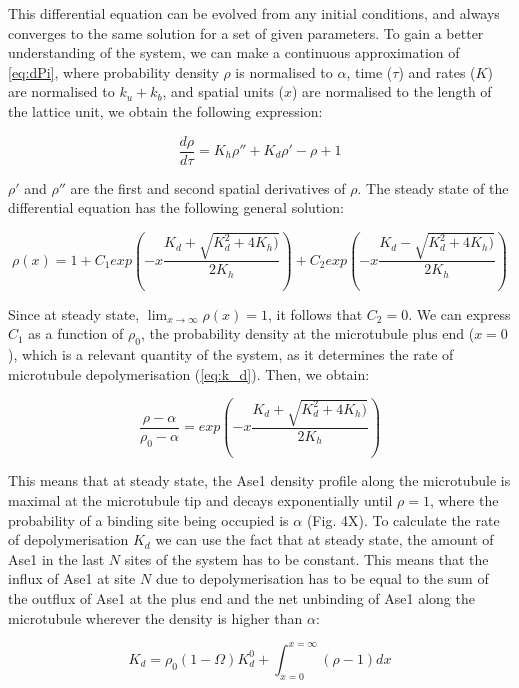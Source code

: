 \documentclass{article}
\begin{document}
This differential equation can be evolved from any initial conditions, and always converges to the same solution for a set of given parameters. To gain a better understanding of the system, we can make a continuous approximation of \autoref{eq:dPi}, where probability density $\rho$ is normalised to $\alpha$, time ($\tau$) and rates ($K$) are normalised to $k_u + k_b$, and spatial units ($x$) are normalised to the length of the lattice unit, we obtain the following expression:

\begin{equation}
\frac{d\rho}{d\tau} = K_h\rho'' + K_d\rho'-\rho+1
\end{equation}

$\rho'$ and $\rho''$ are the first and second spatial derivatives of $\rho$. The steady state of the differential equation has the following general solution:

\begin{equation}
\rho(x) = 1+C_1exp\left(-x\frac{K_d + \sqrt{K_d^2 + 4 K_h)}}{2K_h}\right) + C_2exp\left(-x\frac{K_d - \sqrt{K_d^2 + 4 K_h)}}{2K_h}\right)
\end{equation}

Since at steady state, $\lim_{x\to\infty}\rho(x)=1$, it follows that $C_2=0$. We can express $C_1$ as a function of $\rho_0$, the probability density at the microtubule plus end ($x=0$), which is a relevant quantity of the system, as it determines the rate of microtubule depolymerisation (\autoref{eq:k_d}). Then, we obtain:

\begin{equation}
\label{eq:exponential}
\frac{\rho-\alpha}{\rho_0-\alpha}=exp\left(-x\frac{K_d + \sqrt{K_d^2 + 4 K_h)}}{2K_h}\right)
\end{equation}

This means that at steady state, the Ase1 density profile along the microtubule is maximal at the microtubule tip and decays exponentially until $\rho=1$, where the probability of a binding site being occupied is $\alpha$ (Fig. 4X). To calculate the rate of depolymerisation $K_d$ we can use the fact that at steady state, the amount of Ase1 in the last $N$ sites of the system has to be constant. This means that the influx of Ase1 at site $N$ due to depolymerisation has to be equal to the sum of the outflux of Ase1 at the plus end and the net unbinding of Ase1 along the microtubule wherever the density is higher than $\alpha$:

\begin{equation}
\label{eq:balance}
K_d = \rho_0(1-\Omega)K_d^0 + \int_{x=0}^{x=\infty}\left(\rho-1\right)dx
\end{equation}
\end{document}

